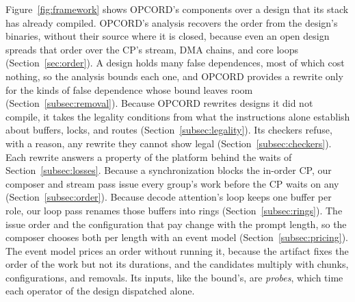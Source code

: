 Figure~\ref{fig:framework} shows OPCORD's components over a design that its stack has already compiled.
OPCORD's analysis recovers the order from the design's binaries, without their source where it is closed, because even an open design spreads that order over the CP's stream, DMA chains, and core loops (Section~\ref{sec:order}).
A design holds many false dependences, most of which cost nothing, so the analysis bounds each one, and OPCORD provides a rewrite only for the kinds of false dependence whose bound leaves room (Section~\ref{subsec:removal}).
Because OPCORD rewrites designs it did not compile, it takes the legality conditions from what the instructions alone establish about buffers, locks, and routes (Section~\ref{subsec:legality}).
Its checkers refuse, with a reason, any rewrite they cannot show legal (Section~\ref{subsec:checkers}).
Each rewrite answers a property of the platform behind the waits of Section~\ref{subsec:losses}.
Because a synchronization blocks the in-order CP, our composer and stream pass issue every group's work before the CP waits on any (Section~\ref{subsec:order}).
Because decode attention's loop keeps one buffer per role, our loop pass renames those buffers into rings (Section~\ref{subsec:rings}).
The issue order and the configuration that pay change with the prompt length, so the composer chooses both per length with an event model (Section~\ref{subsec:pricing}).
The event model prices an order without running it, because the artifact fixes the order of the work but not its durations, and the candidates multiply with chunks, configurations, and removals.
Its inputs, like the bound's, are \emph{probes}, which time each operator of the design dispatched alone.

